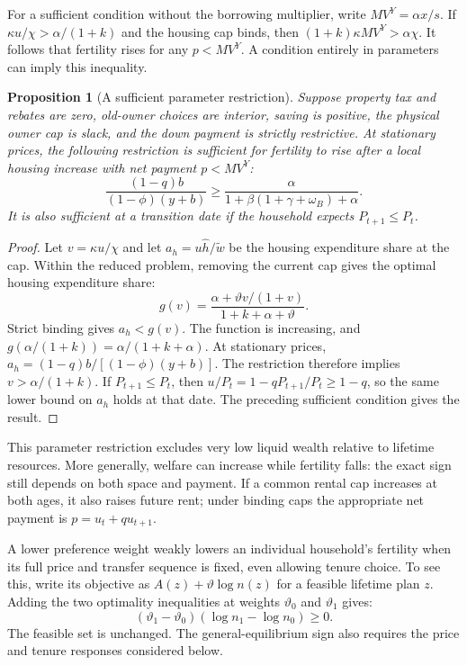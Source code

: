 \documentclass[11pt]{article}
\newtheorem{proposition}{Proposition}
\begin{document}
For a sufficient condition without the borrowing multiplier, write
$MV^Y=\alpha x/s$. If $\kappa u/\chi>\alpha/(1+k)$ and the housing cap
binds, then $(1+k)\kappa MV^Y>\alpha\chi$. It follows that fertility rises
for any $p<MV^Y$. A condition entirely in parameters can imply this inequality.

\begin{proposition}[A sufficient parameter restriction]
\label{prop:amend_primitive}
Suppose property tax and rebates are zero, old-owner choices are interior,
saving is positive, the physical owner cap is slack, and the down payment
is strictly restrictive.
At stationary prices, the following restriction is sufficient for fertility
to rise after a local housing increase with net payment $p<MV^Y$:
\begin{equation}
 \frac{(1-q)b}{(1-\phi)(y+b)}
 \geq\frac{\alpha}{1+\beta(1+\gamma+\omega_B)+\alpha}.
 \label{eq:amend_fully_primitive}
\end{equation}
It is also sufficient at a transition date if the household expects
$P_{t+1}\leq P_t$.
\end{proposition}

\begin{proof}
Let $v=\kappa u/\chi$ and let $a_h=u\widehat h/\widetilde w$ be the
housing expenditure share at the cap. Within the reduced problem, removing
the current cap gives the optimal housing expenditure share:
\begin{equation}
 g(v)=\frac{\alpha+\vartheta v/(1+v)}{1+k+\alpha+\vartheta}.
 \label{eq:amend_unconstrained_share}
\end{equation}
Strict binding gives $a_h<g(v)$. The function is increasing, and
$g(\alpha/(1+k))=\alpha/(1+k+\alpha)$. At stationary prices,
$a_h=(1-q)b/[(1-\phi)(y+b)]$. The restriction therefore implies
$v>\alpha/(1+k)$. If $P_{t+1}\leq P_t$, then
$u/P_t=1-qP_{t+1}/P_t\geq1-q$, so the same lower bound on $a_h$
holds at that date. The preceding sufficient condition gives the result.
\end{proof}

This parameter restriction excludes very low liquid wealth relative to
lifetime resources. More generally, welfare can increase while fertility
falls: the exact sign still depends on both space and payment.
If a common rental cap increases at both ages, it also raises future rent;
under binding caps the appropriate net payment is $p=u_t+qu_{t+1}$.

A lower preference weight weakly lowers an individual household's fertility
when its full price and transfer sequence is fixed, even allowing tenure
choice. To see this, write its objective as $A(z)+\vartheta\log n(z)$ for a
feasible lifetime plan $z$. Adding the two optimality inequalities at
weights $\vartheta_0$ and $\vartheta_1$ gives:
\begin{equation}
 (\vartheta_1-\vartheta_0)(\log n_1-\log n_0)\geq0.
 \label{eq:amend_preference_fertility}
\end{equation}
The feasible set is unchanged. The general-equilibrium sign also requires
the price and tenure responses considered below.
\end{document}

